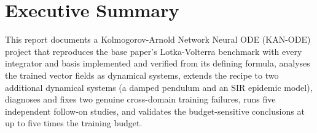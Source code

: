 \section*{\sffamily\color{accent}Executive Summary}

This report documents a Kolmogorov-Arnold Network Neural ODE (KAN-ODE)
\cite{Koenig_2024,liu2024kan,chen2018neuralode} project that
reproduces the base paper's Lotka-Volterra benchmark with every integrator
and basis implemented and verified from its defining formula, analyses the
trained vector fields as dynamical systems, extends the recipe to two
additional dynamical systems (a damped pendulum and an SIR epidemic model),
diagnoses and fixes two genuine cross-domain training failures, runs five
independent follow-on studies, and validates the budget-sensitive
conclusions at up to five times the training budget.

